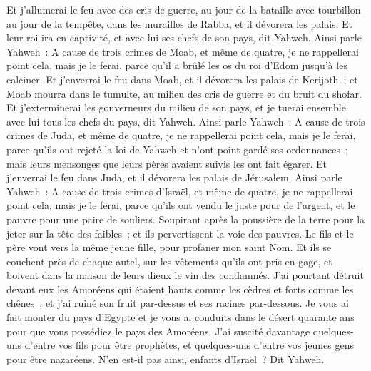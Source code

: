 \begin{multicols}{2}
Et j'allumerai le feu avec des cris de guerre, au jour de la bataille avec tourbillon au jour de la tempête, dans les murailles de Rabba, et il dévorera les palais. 
Et leur roi ira en captivité, et avec lui ses chefs de son pays, dit Yahweh.
\VerseOne{}Ainsi parle Yahweh~: A cause de trois crimes de Moab, et même de quatre, je ne rappellerai point cela, mais je le ferai, parce qu'il a brûlé les os du roi d'Edom jusqu'à les calciner.
Et j'enverrai le feu dans Moab, et il dévorera les palais de Kerijoth~; et Moab mourra dans le tumulte, au milieu des cris de guerre et du bruit du shofar.
Et j'exterminerai les gouverneurs du milieu de son pays, et je tuerai ensemble avec lui tous les chefs du pays, dit Yahweh.
Ainsi parle Yahweh~: A cause de trois crimes de Juda, et même de quatre, je ne rappellerai point cela, mais je le ferai, parce qu'ils ont rejeté la loi de Yahweh et n'ont point gardé ses ordonnances~; mais leurs mensonges que leurs pères avaient suivis les ont fait égarer. 
Et j'enverrai le feu dans Juda, et il dévorera les palais de Jérusalem.
Ainsi parle Yahweh~: A cause de trois crimes d'Israël, et même de quatre, je ne rappellerai point cela, mais je le ferai, parce qu'ils ont vendu le juste pour de l'argent, et le pauvre pour une paire de souliers.
Soupirant après la poussière de la terre pour la jeter sur la tête des faibles~; et ils pervertissent la voie des pauvres. Le fils et le père vont vers la même jeune fille, pour profaner mon saint Nom.
Et ils se couchent près de chaque autel, sur les vêtements qu'ils ont pris en gage, et boivent dans la maison de leurs dieux le vin des condamnés.
J'ai pourtant détruit devant eux les Amoréens qui étaient hauts comme les cèdres et forts comme les chênes~; et j'ai ruiné son fruit par-dessus et ses racines par-dessous.
Je vous ai fait monter du pays d'Egypte et je vous ai conduits dans le désert quarante ans pour que vous possédiez le pays des Amoréens.
J'ai suscité davantage quelques-uns d'entre vos fils pour être prophètes, et quelques-uns d'entre vos jeunes gens pour être nazaréens. N'en est-il pas ainsi, enfants d'Israël~? Dit Yahweh.

\end{multicols}
